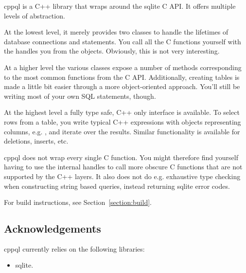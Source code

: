 \gls{cppql} is a C++ library that wraps around the \gls{sqlite} C API. It offers multiple levels of abstraction.

At the lowest level, it merely provides two classes to handle the lifetimes of database connections and \gls{statement}s. You call all the C functions yourself with the handles you  from the objects. Obviously, this is not very interesting.

At a higher level the various classes expose a number of methods corresponding to the most common functions from the C API. Additionally, creating tables is made a little bit easier through a more object-oriented approach. You'll still be writing most of your own SQL statements, though.

At the highest level a fully type safe, C++ only interface is available. To select rows from a table, you write typical C++ expressions with objects representing columns, e.g. , and iterate over the results. Similar functionality is available for deletions, inserts, etc.

\gls{cppql} does not wrap every single C function. You might therefore find yourself having to use the internal handles to call more obscure C functions that are not supported by the C++ layers. It also does not do e.g. exhaustive type checking when constructing string based queries, instead returning \gls{sqlite} error codes.

For build instructions, see Section~\ref{section:build}.

\subsection{Acknowledgements}
\label{section:introduction:acknowledgements}

\gls{cppql} currently relies on the following libraries:
\begin{itemize}
	\item {} \gls{sqlite}\cite{sqlite}.
\end{itemize}